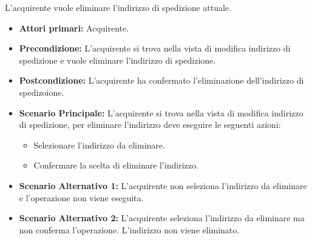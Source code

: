 L'acquirente vuole eliminare l'indirizzo di spedizione attuale.
\begin{itemize}
    \item \textbf{Attori primari:} Acquirente.
    \item \textbf{Precondizione:}  L'acquirente si trova nella vista di modifica indirizzo di spedizione e vuole eliminare l'indirizzo di spedizione.
    \item \textbf{Postcondizione:} L'acquirente ha confermato l'eliminazione dell'indirizzo di spedizoione.
    \item \textbf{Scenario Principale:} L'acquirente si trova nella vista di modifica indirizzo di spedizione, per eliminare l'indirizzo deve eseguire le seguenti azioni:
        \begin{itemize}
            \item Selezionare l'indirizzo da eliminare.
            \item Confermare la scelta di eliminare l'indirizzo.
        \end{itemize}
    \item \textbf{Scenario Alternativo 1:} L'acquirente non seleziona l'indirizzo da eliminare e l'operazione non viene eseguita.
    \item \textbf{Scenario Alternativo 2:} L'acquirente seleziona l'indirizzo da eliminare ma non conferma l'operazione. L'indirizzo non viene eliminato.
\end{itemize}

